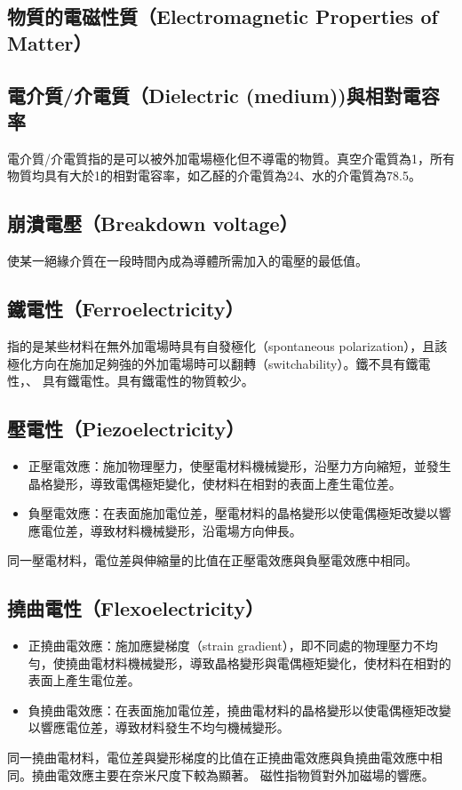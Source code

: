 \documentclass[a4paper,12pt]{report}
\begin{document}
\begin{itemize}
\section{物質的電磁性質（Electromagnetic Properties of Matter）}
\subsection{電介質/介電質（Dielectric (medium))與相對電容率}
電介質/介電質指的是可以被外加電場極化但不導電的物質。真空介電質為1，所有物質均具有大於1的相對電容率，如乙醛的介電質為24、水的介電質為78.5。
\subsection{崩潰電壓（Breakdown voltage）}
使某一絕緣介質在一段時間內成為導體所需加入的電壓的最低值。
\subsection{鐵電性（Ferroelectricity）}
指的是某些材料在無外加電場時具有自發極化（spontaneous polarization），且該極化方向在施加足夠強的外加電場時可以翻轉（switchability）。鐵不具有鐵電性，、 具有鐵電性。具有鐵電性的物質較少。
\subsection{壓電性（Piezoelectricity）}
\begin{itemize}
\item 正壓電效應：施加物理壓力，使壓電材料機械變形，沿壓力方向縮短，並發生晶格變形，導致電偶極矩變化，使材料在相對的表面上產生電位差。
\item 負壓電效應：在表面施加電位差，壓電材料的晶格變形以使電偶極矩改變以響應電位差，導致材料機械變形，沿電場方向伸長。
\end{itemize}
同一壓電材料，電位差與伸縮量的比值在正壓電效應與負壓電效應中相同。
\subsection{撓曲電性（Flexoelectricity）}
\begin{itemize}
\item 正撓曲電效應：施加應變梯度（strain gradient），即不同處的物理壓力不均勻，使撓曲電材料機械變形，導致晶格變形與電偶極矩變化，使材料在相對的表面上產生電位差。
\item 負撓曲電效應：在表面施加電位差，撓曲電材料的晶格變形以使電偶極矩改變以響應電位差，導致材料發生不均勻機械變形。
\end{itemize}
同一撓曲電材料，電位差與變形梯度的比值在正撓曲電效應與負撓曲電效應中相同。撓曲電效應主要在奈米尺度下較為顯著。
磁性指物質對外加磁場的響應。

\end{itemize}
\end{document}

